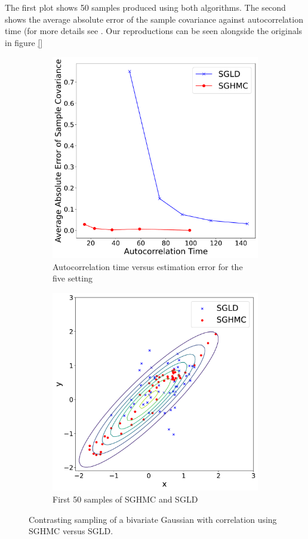 The first plot shows 50 samples produced using both algorithms. The second shows the average absolute error of the sample covariance against autocorrelation time (for more details see \cite{sghmc}. Our reproductions can be seen alongside the originals in figure \ref{}


\begin{figure}[h!]
\begin{subfigure}{.5\textwidth}
\includegraphics[width=.95\linewidth]{parts/Images/fig3a.pdf}
\caption{Autocorrelation time versus estimation error for the five setting}
\label{fig:a}
\end{subfigure}%
\begin{subfigure}{.5\textwidth}
\includegraphics[width=.95\linewidth]{parts/Images/fig3b.pdf}
\caption{First 50 samples of SGHMC and SGLD}
\label{fig:b}
\end{subfigure}
\caption{Contrasting sampling of a bivariate Gaussian with correlation using SGHMC versus SGLD.}
\label{fig:demo}
\end{figure}

